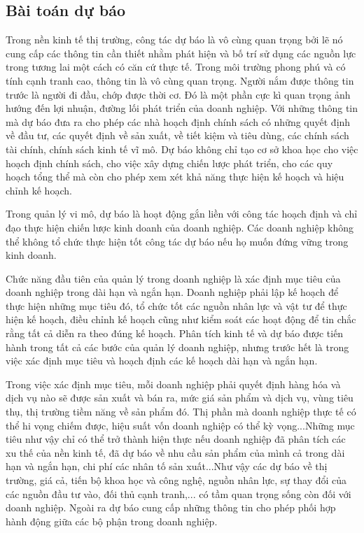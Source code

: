 \subsection{Bài toán dự báo}
Trong nền kinh tế thị trường, công tác dự báo là vô cùng quan trọng bởi lẽ nó cung cấp các thông tin cần thiết nhằm phát hiện và bố trí sử dụng các nguồn lực trong tương lai một cách có căn cứ thực tế. Trong môi trường phong phú và có tính cạnh tranh cao, thông tin là vô cùng quan trọng. Người nắm được thông tin trước là người đi đầu, chớp được thời cơ. Đó là một phần cực kì quan trọng ảnh hướng đến lợi nhuận, đường lối phát triển của doanh nghiệp. Với những thông tin mà dự báo đưa ra cho phép các nhà hoạch định chính sách có những quyết định về đầu tư, các quyết định về sản xuất, về tiết kiệm và tiêu dùng, các chính sách tài chính, chính sách kinh tế vĩ mô. Dự báo không chỉ tạo cơ sở khoa học cho việc hoạch định chính sách, cho việc xây dựng chiến lược phát triển, cho các quy hoạch tổng thể mà còn cho phép xem xét khả năng thực hiện kế hoạch và hiệu chỉnh kế hoạch.

Trong quản lý vi mô, dự báo là hoạt động gắn liền với công tác hoạch định và chỉ đạo thực hiện chiến lược kinh doanh của doanh nghiệp. Các doanh nghiệp không thể không tổ chức thực hiện tốt công tác dự báo nếu họ muốn đứng vững trong kinh doanh.

Chức năng đầu tiên của  quản lý trong doanh nghiệp là xác định mục tiêu của doanh nghiệp trong dài hạn và ngắn hạn. Doanh nghiệp phải lập kế hoạch để thực hiện những mục tiêu đó, tổ chức tốt các nguồn nhân lực và vật tư để thực hiện kế hoạch, điều chỉnh kế hoạch cũng như kiểm soát các hoạt động để tin chắc rằng tất cả diễn ra theo đúng kế hoạch. Phân tích kinh tế và dự báo được tiến hành trong tất cả các bước của quản lý doanh nghiệp, nhưng trước hết là trong việc xác định mục tiêu và hoạch định các kế hoạch dài hạn và ngắn hạn.

Trong việc xác định mục tiêu, mỗi doanh nghiệp phải quyết định hàng hóa và dịch vụ nào sẽ được sản xuất và bán ra, mức giá sản phẩm và dịch vụ, vùng tiêu thụ, thị trường tiềm năng về sản phẩm đó. Thị phần mà doanh nghiệp thực tế có thể hi vọng chiếm được, hiệu suất vốn doanh nghiệp có thể kỳ vọng...Những mục tiêu như vậy chỉ có thể trở thành hiện thực nếu doanh nghiệp đã phân tích các xu thế của nền kinh tế, đã dự báo về nhu cầu sản phẩm của mình cả trong dài hạn và ngắn hạn, chi phí các nhân tố sản xuất...Như vậy các dự báo về thị trường, giá cả, tiến bộ khoa học và công nghệ, nguồn nhân lực, sự thay đổi của các nguồn đầu tư vào, đối thủ cạnh tranh,... có tầm quan trọng sống còn đối với doanh nghiệp. Ngoài ra dự báo cung cấp những thông tin cho phép phối hợp hành động giữa các bộ phận trong doanh nghiệp.

